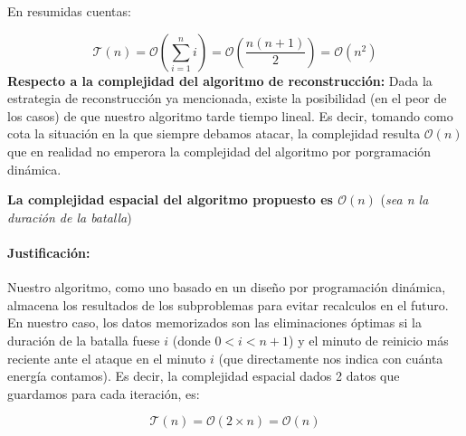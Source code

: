 En resumidas cuentas:

\begin{equation*}
    \mathcal{T}(n)=\mathcal{O}(\sum_{i=1}^{n} i )=\mathcal{O}(\frac{n(n+1)}{2})=\mathcal{O}(n^2)
\end{equation*}
\textbf{Respecto a la complejidad del algoritmo de reconstrucción: } Dada la estrategia de reconstrucción ya mencionada, existe la posibilidad (en el peor de los casos) de que nuestro algoritmo tarde tiempo lineal. Es decir, tomando como cota la situación en la que siempre debamos atacar, la complejidad resulta $\mathcal{O}(n)$ que en realidad no emperora la complejidad del algoritmo por porgramación dinámica. 



\textbf{La complejidad espacial del algoritmo propuesto es  $\mathcal{O}(n)$ } (\textit{sea n la duración de la batalla})
\paragraph{Justificación:} Nuestro algoritmo, como uno basado en un diseño por programación dinámica, almacena los resultados de los subproblemas para evitar recalculos en el futuro. En nuestro caso, los datos memorizados son las eliminaciones óptimas si la duración de la batalla fuese $i$ (donde $0<i<n+1$) y el minuto de reinicio más reciente ante el ataque en el minuto $i$ (que directamente nos indica con cuánta energía contamos). Es decir, la complejidad espacial dados 2 datos que guardamos para cada iteración, es:

\begin{equation*}
    \mathcal{T}(n)=\mathcal{O}(2\times n)=\mathcal{O}(n)
\end{equation*}
 


